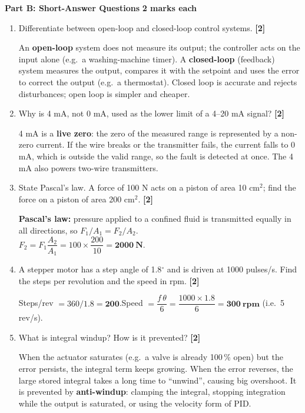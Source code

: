 \documentclass[11pt,a4paper]{article}
\newcommand{\qmarks}[1]{\hfill\textbf{[#1]}}
\newcommand{\partheading}[2]{%
	\bigskip
	\begin{tcolorbox}[colback=cAccent!10, colframe=cAccent, boxrule=0.6pt, arc=2pt, left=6pt, top=3pt, bottom=3pt]
		\textbf{\large #1} \hfill \textbf{#2}
	\end{tcolorbox}}
\begin{document}
	\partheading{Part B: Short-Answer Questions}{2 marks each}
	\begin{enumerate}

		\item Differentiate between open-loop and closed-loop control systems. \qmarks{2}
		\begin{answer}
			An \textbf{open-loop} system does not measure its output; the controller acts on the input alone (e.g.\ a washing-machine timer). A \textbf{closed-loop} (feedback) system measures the output, compares it with the setpoint and uses the error to correct the output (e.g.\ a thermostat). Closed loop is accurate and rejects disturbances; open loop is simpler and cheaper.
		\end{answer}

		\item Why is 4 mA, not 0 mA, used as the lower limit of a 4--20 mA signal? \qmarks{2}
		\begin{answer}
			4 mA is a \textbf{live zero}: the zero of the measured range is represented by a non-zero current. If the wire breaks or the transmitter fails, the current falls to 0 mA, which is outside the valid range, so the fault is detected at once. The 4 mA also powers two-wire transmitters.
		\end{answer}

		\item State Pascal's law. A force of 100 N acts on a piston of area 10 cm$^2$; find the force on a piston of area 200 cm$^2$. \qmarks{2}
		\begin{answer}
			\textbf{Pascal's law:} pressure applied to a confined fluid is transmitted equally in all directions, so $F_1/A_1 = F_2/A_2$.\\
			$F_2 = F_1 \dfrac{A_2}{A_1} = 100\times\dfrac{200}{10} = \mathbf{2000\ N}$.
		\end{answer}

		\item A stepper motor has a step angle of 1.8$^\circ$ and is driven at 1000 pulses/s. Find the steps per revolution and the speed in rpm. \qmarks{2}
		\begin{answer}
			Steps/rev $= 360/1.8 = \mathbf{200}$.\quad Speed $= \dfrac{f\,\theta}{6} = \dfrac{1000\times1.8}{6} = \mathbf{300\ rpm}$ (i.e.\ 5 rev/s).
		\end{answer}

		\item What is integral windup? How is it prevented? \qmarks{2}
		\begin{answer}
			When the actuator saturates (e.g.\ a valve is already 100\,\% open) but the error persists, the integral term keeps growing. When the error reverses, the large stored integral takes a long time to ``unwind'', causing big overshoot. It is prevented by \textbf{anti-windup}: clamping the integral, stopping integration while the output is saturated, or using the velocity form of PID.
		\end{answer}

	\end{enumerate}
\end{document}
